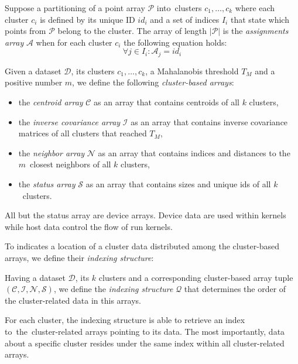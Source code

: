 \begin{defn}
	Suppose a partitioning of a point array $\mathcal{P}$ into~clusters $c_1,\dots,c_k$ where each cluster $c_i$ is defined by its unique ID $id_i$ and a set of indices $I_i$ that state which points from $\mathcal{P}$ belong to the cluster. The array of length $|\mathcal{P}|$ is the \emph{assignments array} $\mathcal{A}$ when for each cluster $c_i$ the following equation holds:
	$${\forall j \in I_i : \mathcal{A}_j = id_i}$$
	\label{def03:assign}
\end{defn}

\begin{defn}
	Given a dataset $\mathcal{D}$, its clusters $c_1,\dots,c_k$, a Mahalanobis threshold $T_M$ and a positive number $m$, we define the following \emph{cluster-based arrays}:
	\begin{itemize}
		\item the \emph{centroid array} $\mathcal{C}$ as an array that contains centroids of all $k$ clusters,
		\item the \emph{inverse covariance array} $\mathcal{I}$ as an array that contains inverse covariance matrices of all clusters that reached $T_M$,
		\item the \emph{neighbor array} $\mathcal{N}$ as an array that contains indices and distances to the~$m$~closest neighbors of all $k$ clusters,
		\item the \emph{status array} $\mathcal{S}$ as an array that contains sizes and unique ids of all $k$~clusters.
	\end{itemize}
	\label{def03:tuple}
\end{defn}


All but the status array are device arrays. Device data are used within kernels while host data control the flow of run kernels.  

To indicates a location of a cluster data distributed among the cluster-based arrays, we define their \emph{indexing structure}: 

\begin{defn}
	Having a dataset $\mathcal{D}$, its $k$ clusters and a corresponding cluster-based array tuple $(\mathcal{C},\mathcal{I},\mathcal{N},\mathcal{S})$, we define the \emph{indexing structure} $\mathcal{Q}$ that determines the order of the cluster-related data in this arrays.
	\label{def03:index}
\end{defn}

For each cluster, the indexing structure is able to retrieve an index to~the~clus\-ter-related arrays pointing to its data. The most importantly, data about a specific cluster resides under the same index within all cluster-related arrays.



